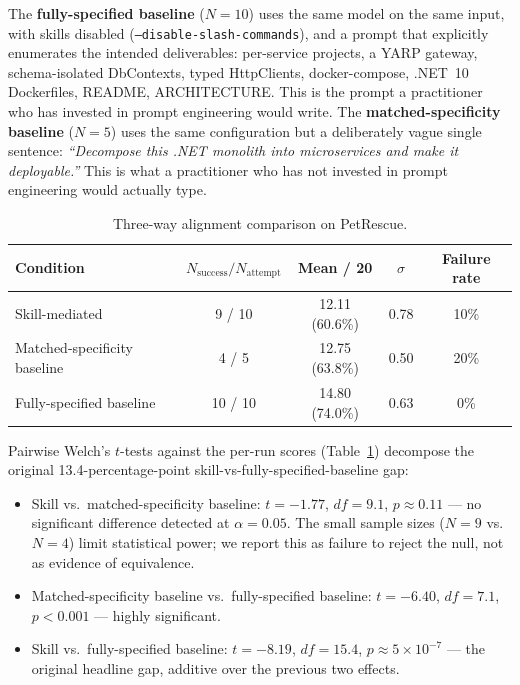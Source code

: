 \documentclass[journal]{IEEEtran}
\begin{document}
The \textbf{fully-specified baseline} ($N{=}10$) uses the same model
on the same input, with skills disabled
(\texttt{--disable-slash-commands}), and a prompt that explicitly
enumerates the intended deliverables: per-service projects, a YARP
gateway, schema-isolated DbContexts, typed HttpClients,
docker-compose, .NET~10 Dockerfiles, README, ARCHITECTURE. This is
the prompt a practitioner who has invested in prompt engineering
would write. The \textbf{matched-specificity baseline} ($N{=}5$)
uses the same configuration but a deliberately vague single
sentence: \textit{``Decompose this .NET monolith into microservices
and make it deployable.''} This is what a practitioner who has not
invested in prompt engineering would actually type.

\begin{table}[t]
\caption{Three-way alignment comparison on PetRescue.}
\label{tab:three-way}
\centering
\small
\begin{tabular}{lcccc}
\toprule
Condition                       & $N_{\mathrm{success}}/N_{\mathrm{attempt}}$ & Mean / 20         & $\sigma$ & Failure rate \\
\midrule
Skill-mediated                  & 9 / 10  & 12.11 (60.6\%) & 0.78 & 10\%   \\
Matched-specificity baseline    & 4 / 5   & 12.75 (63.8\%) & 0.50 & 20\%   \\
Fully-specified baseline        & 10 / 10 & 14.80 (74.0\%) & 0.63 & 0\%    \\
\bottomrule
\end{tabular}
\end{table}

Pairwise Welch's $t$-tests against the per-run scores
(Table~\ref{tab:three-way}) decompose the original 13.4-percentage-point
skill-vs-fully-specified-baseline gap:

\begin{itemize}
  \item Skill vs.\ matched-specificity baseline:
        $t{=}-1.77$, $df{=}9.1$, $p \approx 0.11$ --- no
        significant difference detected at $\alpha{=}0.05$. The
        small sample sizes ($N{=}9$ vs.\ $N{=}4$) limit statistical
        power; we report this as failure to reject the null, not
        as evidence of equivalence.
  \item Matched-specificity baseline vs.\ fully-specified baseline:
        $t{=}-6.40$, $df{=}7.1$, $p < 0.001$ --- highly significant.
  \item Skill vs.\ fully-specified baseline:
        $t{=}-8.19$, $df{=}15.4$, $p \approx 5{\times}10^{-7}$
        --- the original headline gap, additive over the previous
        two effects.
\end{itemize}
\end{document}
